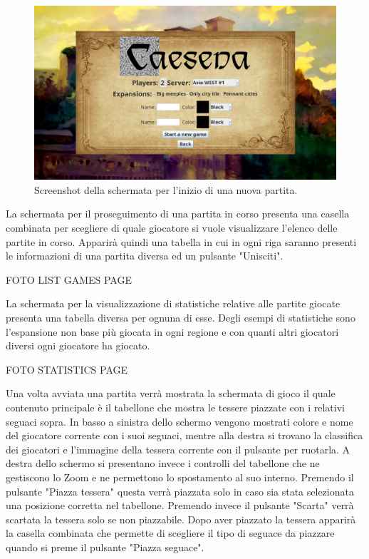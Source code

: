 \begin{figure}[ht]
    \centering\includegraphics[scale=0.25]{images/newGamePage.png}
    \caption{Screenshot della schermata per l'inizio di una nuova partita.}
\end{figure}

La schermata per il proseguimento di una partita in corso presenta una casella combinata per scegliere di quale giocatore si vuole visualizzare l'elenco delle partite in corso. Apparirà quindi una tabella in cui in ogni riga saranno presenti le informazioni di una partita diversa ed un pulsante "Unisciti".

FOTO LIST GAMES PAGE

La schermata per la visualizzazione di statistiche relative alle partite giocate presenta una tabella diversa per ognuna di esse. Degli esempi di statistiche sono l'espansione non base più giocata in ogni regione e con quanti altri giocatori diversi ogni giocatore ha giocato.

FOTO STATISTICS PAGE

Una volta avviata una partita verrà mostrata la schermata di gioco il quale contenuto principale è il tabellone che mostra le tessere piazzate con i relativi seguaci sopra. In basso a sinistra dello schermo vengono mostrati colore e nome del giocatore corrente con i suoi seguaci, mentre alla destra si trovano la classifica dei giocatori e l'immagine della tessera corrente con il pulsante per ruotarla. A destra dello schermo si presentano invece i controlli del tabellone che ne gestiscono lo Zoom e ne permettono lo spostamento al suo interno. Premendo il pulsante "Piazza tessera" questa verrà piazzata solo in caso sia stata selezionata una posizione corretta nel tabellone. Premendo invece il pulsante "Scarta" verrà scartata la tessera solo se non piazzabile. Dopo aver piazzato la tessera apparirà la casella combinata che permette di scegliere il tipo di seguace da piazzare quando si preme il pulsante "Piazza seguace".

